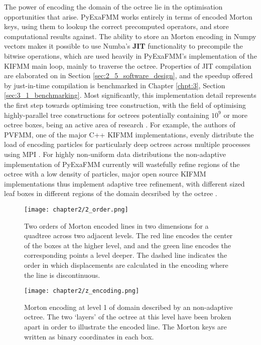 The power of encoding the domain of the octree lie in the optimisation opportunities
that arise. \gls{PyExaFMM} works entirely in terms of encoded Morton keys, using
them to lookup the correct precomputed operators, and store computational results against.
The ability to store an Morton encoding in Numpy vectors makes it possible to use
Numba's \textbf{\gls{JIT}} functionality to precompile the bitwise
operations, which are used heavily in \gls{PyExaFMM}'s implementation of the \gls{KIFMM}
main loop, mainly to traverse the octree. Properties of \gls{JIT} compilation are
elaborated on in Section \ref{sec:2_5_software_design}, and the speedup offered
by just-in-time compilation is benchmarked in Chapter \ref{chpt:3}, Section
\ref{sec:3_1_benchmarking}. Most significantly, this implementation detail
represents the first step towards optimising tree construction, with the
field of optimising highly-parallel tree constructions for octrees potentially containing
$10^9$ or more octree boxes, being an active area of research \cite{Sundar:2008:SIAM,Malhotra:2015:CCP}.
For example, the authors of PVFMM, one of the major C++ \gls{KIFMM} implementations,
evenly distribute the load of encoding particles for particularly deep octrees across
multiple processes using \gls{MPI} \cite{Malhotra:2015:CCP}. For highly non-uniform
data distributions the non-adaptive implementation of \gls{PyExaFMM} currently
will wastefully refine regions of the octree with a low density of particles, major
open source \gls{KIFMM} implementations thus implement adaptive tree refinement,
with different sized leaf boxes in different regions of the domain decsribed by
the octree \cite{Ying:2004:JCP, Malhotra:2015:CCP, exafmm}.

\begin{figure}[!h]
    \centering
    {\texttt{[image: chapter2/2\_order.png]}}
    \vspace{0pt}
    \caption{
        Two orders of Morton encoded lines in two dimensions for a quadtree across
        two adjacent levels. The red line encodes the center of the boxes at the higher level,
        and and the green line encodes the corresponding points a level deeper.
        The dashed line indicates the order in which displacements are calculated
        in the encoding where the line is discontinuous.
    }
    \label{fig:2_2_multi_order}
\end{figure}


\begin{figure}[!h]
    \centering
    {\texttt{[image: chapter2/z\_encoding.png]}}
    \vspace{0pt}
    \caption{
        Morton encoding at level 1 of domain described by an non-adaptive octree.
        The two `layers' of the octree at this level have been broken apart
        in order to illustrate the encoded line. The Morton keys are written
        as binary coordinates in each box.
    }
    \label{fig:2_2_morton_encoding}
\end{figure}